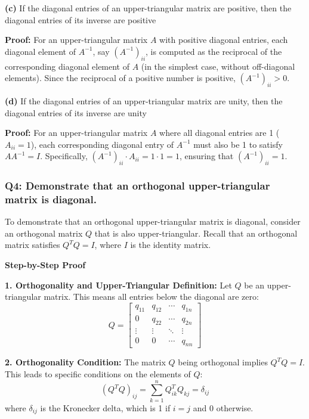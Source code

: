 \documentclass[8pt]{article}
\begin{document}
\textbf{(c)} If the diagonal entries of an upper-triangular matrix are positive, then the diagonal entries of its inverse are positive

\textbf{Proof:}
For an upper-triangular matrix \( A \) with positive diagonal entries, each diagonal element of \( A^{-1} \), say \( (A^{-1})_{ii} \), is computed as the reciprocal of the corresponding diagonal element of \( A \) (in the simplest case, without off-diagonal elements). Since the reciprocal of a positive number is positive, \( (A^{-1})_{ii} > 0 \).

\textbf{(d)} If the diagonal entries of an upper-triangular matrix are unity, then the diagonal entries of its inverse are unity

\textbf{Proof:}
For an upper-triangular matrix \( A \) where all diagonal entries are 1 (\( A_{ii} = 1 \)), each corresponding diagonal entry of \( A^{-1} \) must also be 1 to satisfy \( AA^{-1} = I \). Specifically, \( (A^{-1})_{ii} \cdot A_{ii} = 1 \cdot 1 = 1 \), ensuring that \( (A^{-1})_{ii} = 1 \).

\subsubsection*{Q4: Demonstrate that an orthogonal upper-triangular matrix is diagonal.}

To demonstrate that an orthogonal upper-triangular matrix is diagonal, consider an orthogonal matrix \( Q \) that is also upper-triangular. Recall that an orthogonal matrix satisfies \( Q^TQ = I \), where \( I \) is the identity matrix.

\textbf{Step-by-Step Proof}

\textbf{1. Orthogonality and Upper-Triangular Definition:}
   Let \( Q \) be an upper-triangular matrix. This means all entries below the diagonal are zero:
   \[
   Q = \begin{bmatrix}
   q_{11} & q_{12} & \cdots & q_{1n} \\
   0 & q_{22} & \cdots & q_{2n} \\
   \vdots & \vdots & \ddots & \vdots \\
   0 & 0 & \cdots & q_{nn}
   \end{bmatrix}
   \]

\textbf{2. Orthogonality Condition:}
   The matrix \( Q \) being orthogonal implies \( Q^TQ = I \). This leads to specific conditions on the elements of \( Q \):
   \[
   (Q^TQ)_{ij} = \sum_{k=1}^n Q^T_{ik}Q_{kj} = \delta_{ij}
   \]
   where \( \delta_{ij} \) is the Kronecker delta, which is 1 if \( i=j \) and 0 otherwise.
\end{document}
